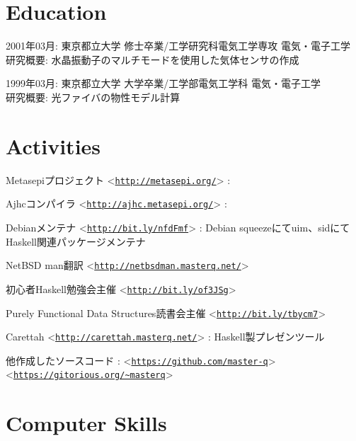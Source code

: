 \documentclass[letterpaper]{article}
\renewenvironment{itemize}{
  \begin{list}{}{
    \setlength{\leftmargin}{1.5em}
  }
}{
  \end{list}
}
\begin{document}
\section*{Education}

\begin{itemize}
  \item 2001年03月: 東京都立大学 修士卒業/工学研究科電気工学専攻 電気・電子工学 \\
    研究概要: 水晶振動子のマルチモードを使用した気体センサの作成
  \item 1999年03月: 東京都立大学 大学卒業/工学部電気工学科 電気・電子工学 \\
    研究概要: 光ファイバの物性モデル計算
\end{itemize}

\section*{Activities}

\begin{itemize}
  \item Metasepiプロジェクト <\href{http://metasepi.org/}{\tt http://metasepi.org/}> :
  \item Ajhcコンパイラ <\href{http://ajhc.metasepi.org/}{\tt http://ajhc.metasepi.org/}> :
  \item Debianメンテナ <\href{http://bit.ly/nfdFmf}{\tt http://bit.ly/nfdFmf}> :
    Debian squeezeにてuim、sidにてHaskell関連パッケージメンテナ
  \item NetBSD man翻訳 <\href{http://netbsdman.masterq.net/}{\tt http://netbsdman.masterq.net/}>
  \item 初心者Haskell勉強会主催 <\href{http://bit.ly/of3JSg}{\tt http://bit.ly/of3JSg}>
  \item Purely Functional Data Structures読書会主催 <\href{http://bit.ly/tbycm7}{\tt http://bit.ly/tbycm7}>
  \item Carettah <\href{http://carettah.masterq.net/}{\tt http://carettah.masterq.net/}> : Haskell製プレゼンツール
  \item 他作成したソースコード :
    <\href{https://github.com/master-q}{\tt https://github.com/master-q}>
    <\href{https://gitorious.org/\~{}masterq}{\tt https://gitorious.org/\~{}masterq}>
\end{itemize}

\section*{Computer Skills}
\end{document}
